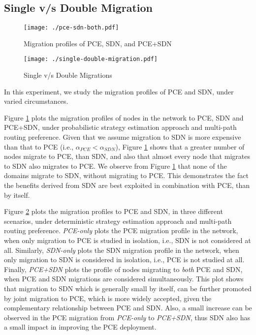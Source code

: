 \documentclass[smallextended]{svjour3}
\begin{document}
\subsection{Single v/s Double Migration}

\begin{figure}
\begin{center}
\texttt{[image: ./pce-sdn-both.pdf]}
\caption{Migration profiles of PCE, SDN, and PCE+SDN}
\label{fig:pce-sdn-both}
\end{center}
\end{figure}

\begin{figure}
\begin{center}
\texttt{[image: ./single-double-migration.pdf]}
\caption{Single v/s Double Migrations}
\label{fig:single v/s double migrations}
\end{center}
\end{figure}

\par In this experiment, we study the migration profiles of PCE and SDN, under
varied circumstances.

\par Figure \ref{fig:pce-sdn-both} plots the migration profiles of nodes in the
network to PCE, SDN and PCE+SDN, under probabilistic strategy estimation
approach and multi-path routing preference. Given that we assume migration to
SDN is more expensive than that to PCE (i.e., $\alpha_{PCE}<\alpha_{SDN}$),
Figure \ref{fig:pce-sdn-both} shows that a greater number of nodes migrate to PCE, than SDN, and also that almost every
node that migrates to SDN also migrates to PCE. We observe from Figure
\ref{fig:pce-sdn-both} that none of the domains migrate to SDN, without
migrating to PCE. This demonstrates the fact the benefits derived from SDN are
best exploited in combination with PCE, than by itself.

\par Figure \ref{fig:single v/s double migrations} plots the migration profiles
to PCE and SDN, in three different scenarios, under deterministic strategy
estimation approach and multi-path routing preference.
\emph{PCE-only} plots the PCE migration profile in the network, when only migration to PCE is studied in
isolation, i.e.,  SDN is not considered at all. Similarly, \emph{SDN-only} plots
the SDN migration profile in the network, when only migration to SDN is considered in
isolation, i.e.,  PCE is not studied at all. Finally, \emph{PCE+SDN} plots the
profile of nodes migrating to \emph{both} PCE and SDN, when PCE and SDN
migrations are considered simultaneously. This plot shows that migration to SDN
which is generally small by itself, can be further promoted by joint migration
to PCE, which is more widely accepted, given the complementary relationship
between PCE and SDN. Also, a small increase can be
observed in the PCE migration from \emph{PCE-only} to \emph{PCE+SDN}, thus SDN also has a
small impact in improving the PCE deployment.
\end{document}
